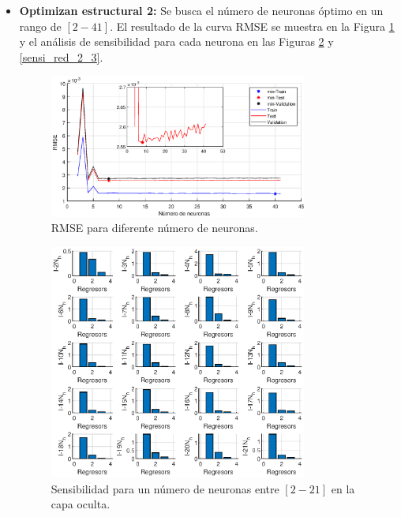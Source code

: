\documentclass[12pt]{article}
\begin{document}
\begin{itemize}
	\newpage
	\item \textbf{Optimizan estructural 2:} Se busca el número de neuronas óptimo en un rango de $[2-41]$. El resultado de la curva RMSE se muestra en la Figura \ref{rmse_3} y el análisis de sensibilidad para cada neurona en las Figuras \ref{sensi_red_1_3} y \ref{sensi_red_2_3}.

	\begin{figure}[h!]
		\centering
		 \includegraphics[width=0.8\textwidth]{imag/redes/RMSE_full.eps}
		\caption{RMSE para diferente número de neuronas.}
		\label{rmse_3}
	\end{figure}
	\newpage
	\clearpage
	\begin{figure}[t!]
		\centering
		 \includegraphics[width=0.8\textwidth]{imag/redes/sensibilidad_full_1_3.eps}
		\caption{Sensibilidad para un número de neuronas entre $[2-21]$ en la capa oculta.}
		\label{sensi_red_1_3}

\end{figure}
\end{itemize}
\end{document}
